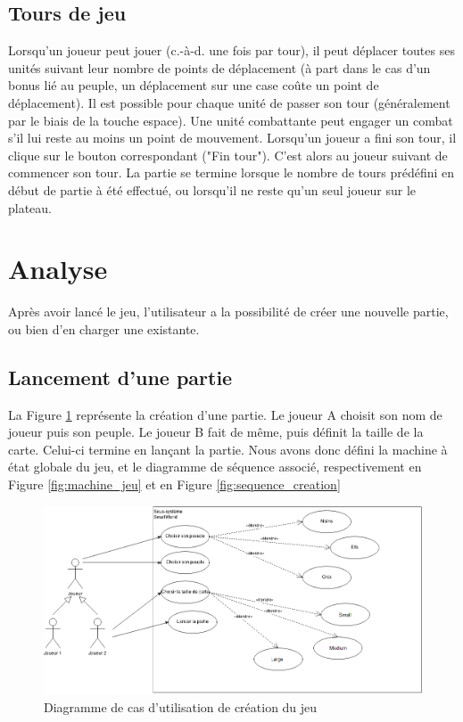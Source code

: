 \documentclass[a4paper]{article}
\begin{document}
	\subsection{Tours de jeu}
Lorsqu’un joueur peut jouer (c.-à-d. une fois par tour), il peut déplacer toutes ses unités suivant leur nombre de points de déplacement (à part dans le cas d'un bonus lié au peuple, un déplacement sur une case coûte un point de déplacement). Il est possible pour chaque unité de passer son tour (généralement par le biais de la touche espace). Une unité combattante peut engager un combat s’il lui reste au moins un point de mouvement. Lorsqu’un joueur a fini son tour, il clique sur le bouton correspondant ("Fin tour"). C’est alors au joueur suivant de commencer son tour. La partie se termine lorsque le nombre de tours prédéfini en début de partie à été effectué, ou lorsqu’il ne reste qu’un seul joueur sur le plateau.

\section{Analyse}
	
Après avoir lancé le jeu, l'utilisateur a la possibilité de créer une nouvelle partie, ou bien d'en charger une existante.
	
	\subsection{Lancement d'une partie}
La Figure \ref{fig:cas_creation} représente la création d'une partie. Le joueur A choisit son nom de joueur puis son peuple. Le joueur B fait de même, puis définit la taille de la carte. Celui-ci termine en lançant la partie. Nous avons donc défini la machine à état globale du jeu, et le diagramme de séquence associé, respectivement en Figure \ref{fig:machine_jeu} et en Figure \ref{fig:sequence_creation}

\begin{figure}[ht]
\centering
	\includegraphics[width=1\textwidth]{../Schemas/CU_Creation.png}
		\caption{Diagramme de cas d'utilisation de création du jeu}
		\label{fig:cas_creation}
\end{figure}
\end{document}
